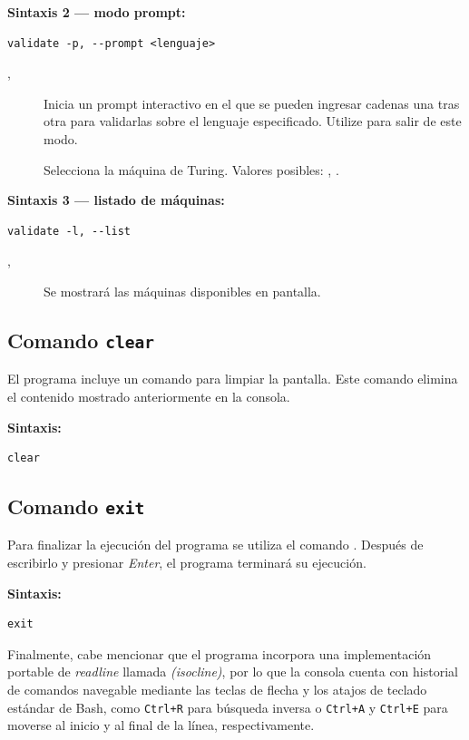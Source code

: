 \documentclass[../main.tex]{subfiles}
\begin{document}
    \textbf{Sintaxis 2 — modo prompt:}

    \begin{lstlisting}[style=console]
    validate -p, --prompt <lenguaje>
    \end{lstlisting}

    \begin{description}
        \item[, ] Inicia un prompt interactivo en el
        que se pueden ingresar cadenas una tras otra para validarlas sobre el
        lenguaje especificado. Utilize  para salir de este modo.
        \item[] Selecciona la máquina de Turing. Valores
        posibles: , .
    \end{description}

    \textbf{Sintaxis 3 — listado de máquinas:}

    \begin{lstlisting}[style=console]
    validate -l, --list
    \end{lstlisting}

    \begin{description}
        \item[, ] Se mostrará las máquinas disponibles en pantalla.
    \end{description}

    \subsection{Comando \texttt{clear}}

    El programa incluye un comando para limpiar la pantalla. Este comando elimina
    el contenido mostrado anteriormente en la consola.

    \textbf{Sintaxis:}
    \begin{lstlisting}[style=console]
    clear
    \end{lstlisting}

    \subsection{Comando \texttt{exit}}

    Para finalizar la ejecución del programa se utiliza el comando .
    Después de escribirlo y presionar \textit{Enter}, el programa terminará su
    ejecución.

    \textbf{Sintaxis:}
    \begin{lstlisting}[style=console]
    exit
    \end{lstlisting}

    Finalmente, cabe mencionar que el programa incorpora una implementación
    portable de \emph{readline} llamada \emph{(isocline)}, por lo que la
    consola cuenta con historial de comandos navegable mediante las teclas de
    flecha y los atajos de teclado estándar de Bash, como \texttt{Ctrl+R} para
    búsqueda inversa o \texttt{Ctrl+A} y \texttt{Ctrl+E} para moverse al inicio y
    al final de la línea, respectivamente.
\end{document}
